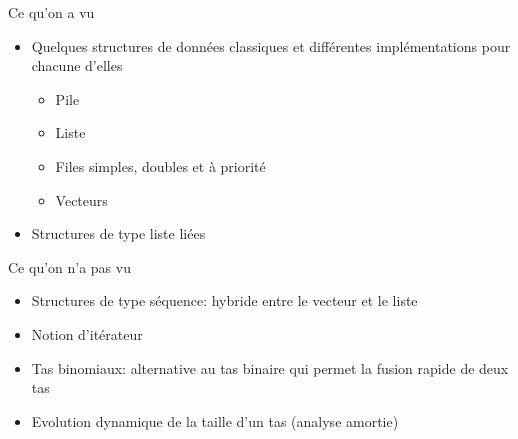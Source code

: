 \begin{frame}{Ce qu'on a vu}

\begin{itemize}
\item Quelques structures de données classiques et différentes implémentations pour chacune d'elles
\begin{itemize}
\item Pile
\item Liste
\item Files simples, doubles et à priorité
\item Vecteurs
\end{itemize}
\item Structures de type liste liées
\end{itemize}

\end{frame}

\begin{frame}{Ce qu'on n'a pas vu}

\begin{itemize}
\item Structures de type séquence: hybride entre le vecteur et le
  liste
\item Notion d'itérateur
\item Tas binomiaux: alternative au tas binaire qui permet la fusion
  rapide de deux tas
\item Evolution dynamique de la taille d'un tas (analyse amortie)
\end{itemize}

\end{frame}
